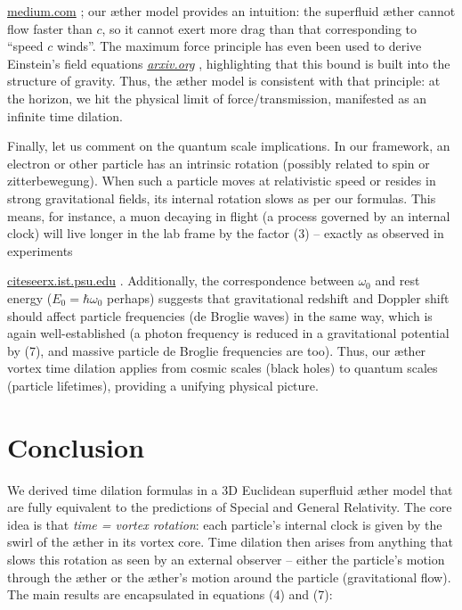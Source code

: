 \documentclass[aps,preprint,superscriptaddress]{revtex4}
\begin{document}
\href{https://medium.com/@motionmountain/4-there-is-a-maximum-force-in-nature-d87e1951e9a4#:~:text=,implies%20inverse%20square%20gravity}{medium.com}
; our æther model provides an intuition: the superfluid æther cannot flow faster than $c$, so it cannot exert more drag than that corresponding to “speed $c$ winds”. The maximum force principle has even been used to derive Einstein’s field equations \href{https://arxiv.org/abs/2205.06302#:~:text=the%20principle%20of%20maximum%20force,The%20limits%20illuminate}{\textit{arxiv.org}}
, highlighting that this bound is built into the structure of gravity. Thus, the æther model is consistent with that principle: at the horizon, we hit the physical limit of force/transmission, manifested as an infinite time dilation.


Finally, let us comment on the quantum scale implications. In our framework, an electron or other particle has an intrinsic rotation (possibly related to spin or zitterbewegung). When such a particle moves at relativistic speed or resides in strong gravitational fields, its internal rotation slows as per our formulas. This means, for instance, a muon decaying in flight (a process governed by an internal clock) will live longer in the lab frame by the factor (3) – exactly as observed in experiments

\href{https://citeseerx.ist.psu.edu/document?repid=rep1&type=pdf&doi=25483f1ebc9dc442a9f1505a49d96eb35e92e3f4#:~:text=al,related%20to%20this%20hypothesis%2C%20including}{citeseerx.ist.psu.edu}
. Additionally, the correspondence between $\omega_0$ and rest energy ($E_0=\hbar \omega_0$ perhaps) suggests that gravitational redshift and Doppler shift should affect particle frequencies (de Broglie waves) in the same way, which is again well-established (a photon frequency is reduced in a gravitational potential by (7), and massive particle de Broglie frequencies are too). Thus, our æther vortex time dilation applies from cosmic scales (black holes) to quantum scales (particle lifetimes), providing a unifying physical picture.


\section*{Conclusion}

We derived time dilation formulas in a 3D Euclidean superfluid æther model that are fully equivalent to the predictions of Special and General Relativity. The core idea is that \textit{time = vortex rotation}: each particle’s internal clock is given by the swirl of the æther in its vortex core. Time dilation then arises from anything that slows this rotation as seen by an external observer – either the particle’s motion through the æther or the æther’s motion around the particle (gravitational flow). The main results are encapsulated in equations (4) and (7):
\end{document}
